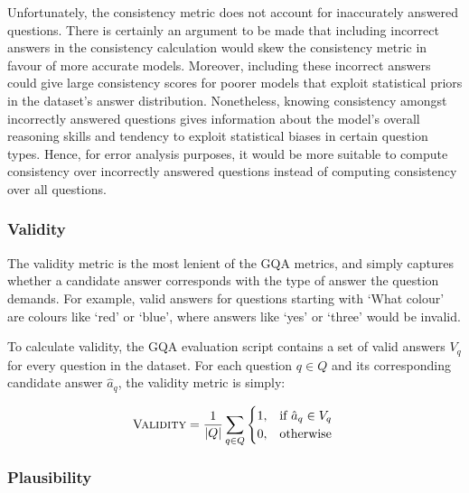 
Unfortunately, the consistency metric does not account for inaccurately answered questions. There is certainly an argument to be made that including incorrect answers in the consistency calculation would skew the consistency metric in favour of more accurate models. Moreover, including these incorrect answers could give large consistency scores for poorer models that exploit statistical priors in the dataset's answer distribution.
Nonetheless, knowing consistency amongst incorrectly answered questions gives information about the model's overall reasoning skills and tendency to exploit statistical biases in certain question types. Hence, for error analysis purposes, it would be more suitable to compute consistency over incorrectly answered questions instead of computing consistency over all questions.


\subsubsection{Validity}

The validity metric is the most lenient of the GQA metrics, and simply captures whether a candidate answer corresponds with the type of answer the question demands. For example, valid answers for questions starting with `What colour' are colours like `red' or `blue', where answers like `yes' or `three' would be invalid.

To calculate validity, the GQA evaluation script \cite{hudson2019evaluation_script} contains a set of valid answers \(V_q\) for every question in the dataset. For each question \(q \in Q\) and its corresponding candidate answer \(\hat{a}_q\), the validity metric is simply:

\begin{equation}
    \textsc{Validity} = \frac{1}{|Q|}\sum_{q \in Q} \begin{cases}
        1, &\text{if } \hat{a}_q \in V_q\\
        0, &\text{otherwise }\\
    \end{cases}
    \label{equation:validity}
\end{equation}

\subsubsection{Plausibility}

